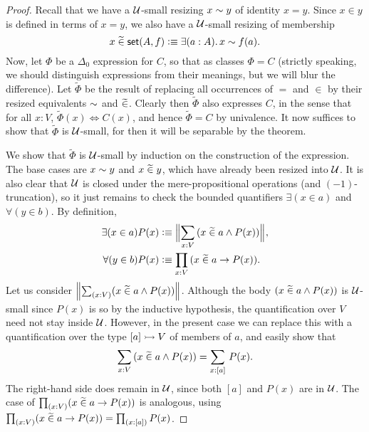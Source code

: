 \begin{proof}
Recall that we have a $\mathcal{U}$-small resizing $x \sim y$ of identity $x = y$. Since $x\in y$ is defined in terms of $x=y$, we also have a $\mathcal{U}$-small resizing of membership
% 
\begin{equation*}
  x\bin\vset(A,f) \defeq \exis{a:A} x \bisim f(a).
\end{equation*}
%
Now, let $\Phi$ be a $\Delta_0$ expression for $C$, so that as classes $\Phi = C$ (strictly speaking, we should distinguish expressions from their meanings, but we will blur the difference). Let $\widetilde{\Phi}$ be the result of replacing all occurrences of $=$ and $\in$ by their resized equivalents $\sim$ and $\mathrel{\widetilde{\in}}$.  Clearly then $\widetilde{\Phi}$ also expresses $C$, in the sense that for all $x:V$, $\widetilde{\Phi}(x) \Leftrightarrow C(x)$, and hence $\widetilde{\Phi}=C$ by univalence.  It now suffices to show that $\widetilde{\Phi}$ is $\mathcal{U}$-small, for then it will be separable by the theorem.  

We show that  $\widetilde{\Phi}$ is $\mathcal{U}$-small by induction on the construction of the expression.  The base cases are $x \sim y$ and $x\mathrel{\widetilde{\in}} y$, which have already been resized into $\mathcal{U}$.  It is also clear that $\mathcal{U}$ is closed under the mere-propositional operations (and $(-1)$-truncation), so it just remains to check the bounded quantifiers $\exists(x\in a)$ and $\forall(y\in b)$.  By definition,  
\begin{align*}
\exists(x\in a) P(x) &\defeq \Brck {\sm{x:V}(x\bin a \land P(x))},\\
\forall(y\in b) P(x) &\defeq  \prd{x:V}(x\bin a \to P(x)).
\end{align*} 
Let us consider $\brck {\sm{x:V}(x\bin a \land P(x))}$.  Although the body $(x\mathrel{\widetilde{\in}} a \land P(x))$ is $\mathcal{U}$-small since $P(x)$ is so by the inductive hypothesis, the quantification over $V$ need not stay inside $\mathcal{U}$.  However, in the present case we can replace this with a quantification over the type $[a]\rightarrowtail V$ of members of $a$, and easily show that
\begin{equation*}
  \sm{x:V}(x\bin a \land P(x)) = \sm{x:[a]} P(x).
\end{equation*}
The right-hand side does remain in $\mathcal{U}$, since both $[a]$ and $P(x)$ are in $\mathcal{U}$.  The case of $\prd{x:V}(x\bin a \to P(x))$ is analogous, using $\prd{x:V}(x\bin a \to P(x)) = \prd{x:[a]}P(x)$.
\end{proof}

